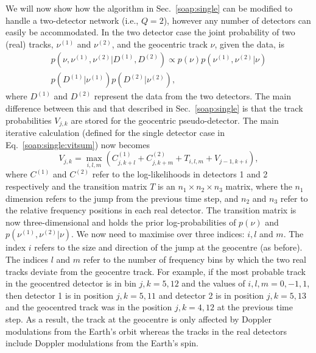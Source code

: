 We will now show how the algorithm in Sec.~\ref{soap:single} can be modified to handle a two-detector network (i.e., $Q=2$),  however any number of detectors can easily be accommodated. In the two detector case the joint probability of two (real) tracks, $\nu^{(1)}$ and $\nu^{(2)}$, and the geocentric track $\nu$, given the data, is
%
\begin{equation}
\begin{split}
p(\nu,\nu^{(1)},\nu^{(2)} | D^{(1)},D^{(2)}) \propto p(\nu)p(\nu^{(1)},\nu^{(2)} | \nu) \\
p(D^{(1)} | \nu^{(1)})p(D^{(2)} | \nu^{(2)}),
\end{split}
\end{equation}
%
where $D^{(1)}$ and $D^{(2)}$ represent the data from the two detectors. The
main difference between this and that described in Sec.~\ref{soap:single} is
that the track probabilities $V_{j,k}$ are stored for the geocentric
pseudo-detector. The main iterative calculation (defined for the single
detector case in Eq.~\ref{soap:single:vitsum}) now becomes
%
\begin{equation}
\label{soap:multidet:vitsum}
  V_{j,k} = \max_{i,l,m}({C}^{(1)}_{j,k+l} + {C}^{(2)}_{j,k+m} + T_{i,l,m} +V_{j-1,k+i}),
\end{equation}
%
where ${C}^{(1)}$ and ${C}^{(2)}$ refer to the log-likelihoods in detectors 1 and 2 respectively and the transition matrix $T$ is an $n_1\times n_2 \times n_3$ matrix, where the $n_1$ dimension refers to the jump from the previous time step, and $n_2$ and $n_3$ refer to the relative frequency positions in each real detector. The transition matrix is now three-dimensional and holds the prior log-probabilities of $p(\nu)$ and $p(\nu^{(1)},\nu^{(2)} | \nu)$.  We now need to maximise over three indices: $i,l$ and $m$. The index $i$ refers to the size and direction of the jump at the geocentre (as before). The indices $l$ and $m$ refer to the number of frequency bins by which the two real tracks deviate from the geocentre track. For example, if the most probable track in the geocentred detector is in bin $j,k = 5,12$ and the values of $i,l,m = 0,-1,1$, then detector 1 is in position $j,k={5,11}$ and detector 2 is in position $j,k={5,13}$ and the geocentred track was in the position $j,k={4,12}$ at the previous time step. As a result, the track at the geocentre is only affected by Doppler modulations from the Earth's orbit whereas the tracks in the real detectors include Doppler modulations from the Earth's spin.


